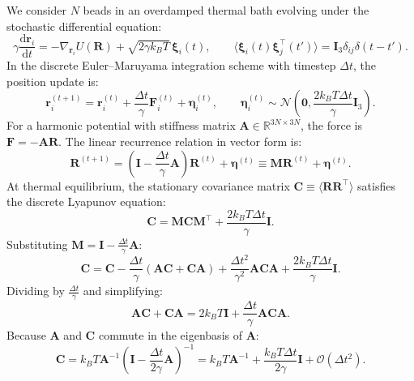 \documentclass[12pt,a4paper]{article}
\newcommand{\Obig}[1]{\mathcal{O}\!\left(#1\right)}
\begin{document}
We consider $N$ beads in an overdamped thermal bath evolving under the stochastic differential equation:
\begin{equation}
  \gamma \frac{\mathrm{d}\mathbf{r}_i}{\mathrm{d}t} = -\nabla_{\mathbf{r}_i} U(\mathbf{R}) + \sqrt{2 \gamma k_B T}\,\boldsymbol{\xi}_i(t), \qquad \langle \boldsymbol{\xi}_i(t) \boldsymbol{\xi}_j^\top(t') \rangle = \mathbf{I}_3 \delta_{ij} \delta(t - t').
\end{equation}
In the discrete Euler--Maruyama integration scheme with timestep $\Delta t$, the position update is:
\begin{equation}
  \mathbf{r}_i^{(t+1)} = \mathbf{r}_i^{(t)} + \frac{\Delta t}{\gamma} \mathbf{F}_i^{(t)} + \boldsymbol{\eta}_i^{(t)}, \qquad \boldsymbol{\eta}_i^{(t)} \sim \mathcal{N}\left(\mathbf{0}, \frac{2 k_B T \Delta t}{\gamma} \mathbf{I}_3\right).
\end{equation}
For a harmonic potential with stiffness matrix $\mathbf{A} \in \mathbb{R}^{3N \times 3N}$, the force is $\mathbf{F} = -\mathbf{A} \mathbf{R}$. The linear recurrence relation in vector form is:
\begin{equation}
  \mathbf{R}^{(t+1)} = \left(\mathbf{I} - \frac{\Delta t}{\gamma} \mathbf{A}\right) \mathbf{R}^{(t)} + \boldsymbol{\eta}^{(t)} \equiv \mathbf{M} \mathbf{R}^{(t)} + \boldsymbol{\eta}^{(t)}.
\end{equation}
At thermal equilibrium, the stationary covariance matrix $\mathbf{C} \equiv \langle \mathbf{R} \mathbf{R}^\top \rangle$ satisfies the discrete Lyapunov equation:
\begin{equation}
  \mathbf{C} = \mathbf{M} \mathbf{C} \mathbf{M}^\top + \frac{2 k_B T \Delta t}{\gamma} \mathbf{I}.
\end{equation}
Substituting $\mathbf{M} = \mathbf{I} - \frac{\Delta t}{\gamma} \mathbf{A}$:
\begin{equation}
  \mathbf{C} = \mathbf{C} - \frac{\Delta t}{\gamma} (\mathbf{A} \mathbf{C} + \mathbf{C} \mathbf{A}) + \frac{\Delta t^2}{\gamma^2} \mathbf{A} \mathbf{C} \mathbf{A} + \frac{2 k_B T \Delta t}{\gamma} \mathbf{I}.
\end{equation}
Dividing by $\frac{\Delta t}{\gamma}$ and simplifying:
\begin{equation}
  \mathbf{A} \mathbf{C} + \mathbf{C} \mathbf{A} = 2 k_B T \mathbf{I} + \frac{\Delta t}{\gamma} \mathbf{A} \mathbf{C} \mathbf{A}.
\end{equation}
Because $\mathbf{A}$ and $\mathbf{C}$ commute in the eigenbasis of $\mathbf{A}$:
\begin{equation}
  \mathbf{C} = k_B T \mathbf{A}^{-1} \left( \mathbf{I} - \frac{\Delta t}{2\gamma} \mathbf{A} \right)^{-1} = k_B T \mathbf{A}^{-1} + \frac{k_B T \Delta t}{2\gamma} \mathbf{I} + \Obig{\Delta t^2}.
\end{equation}
\end{document}
